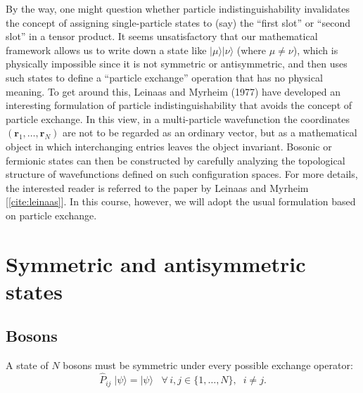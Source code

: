 \documentclass[pra,12pt]{revtex4}
\begin{document}
By the way, one might question whether particle indistinguishability
invalidates the concept of assigning single-particle states to (say)
the ``first slot'' or ``second slot'' in a tensor product.  It seems
unsatisfactory that our mathematical framework allows us to write down
a state like $|\mu\rangle|\nu\rangle$ (where $\mu\ne\nu$), which is
physically impossible since it is not symmetric or antisymmetric, and
then uses such states to define a ``particle exchange'' operation that
has no physical meaning.  To get around this, Leinaas and Myrheim
(1977) have developed an interesting formulation of particle
indistinguishability that avoids the concept of particle exchange.  In
this view, in a multi-particle wavefunction the coordinates
$(\mathbf{r}_1, \dots, \mathbf{r}_N)$ are not to be regarded as an
ordinary vector, but as a mathematical object in which interchanging
entries leaves the object invariant.  Bosonic or fermionic states can
then be constructed by carefully analyzing the topological structure
of wavefunctions defined on such configuration spaces.  For more
details, the interested reader is referred to the paper by Leinaas and
Myrheim [\ref{cite:leinaas}].  In this course, however, we will adopt
the usual formulation based on particle exchange.

\section{Symmetric and antisymmetric states}

\subsection{Bosons}
\label{sec:bosons}

A state of $N$ bosons must be symmetric under every possible exchange
operator:
\begin{equation}
  \hat{P}_{ij}\; |\psi\rangle = |\psi\rangle \;\;\; \forall\, i, j \in\{1,\dots,N\},\;\; i\ne j.
  \label{sym}
\end{equation}
\end{document}
